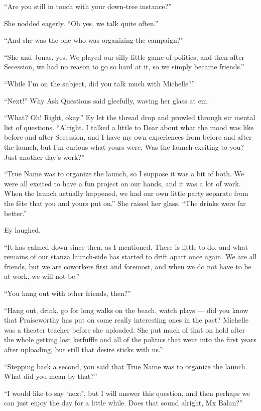 ``Are you still in touch with your down-tree instance?''

She nodded eagerly. ``Oh yes, we talk quite often.''

``And she was the one who was organizing the campaign?''

``She and Jonas, yes. We played our silly little game of politics, and then after Secession, we had no reason to go so hard at it, so we simply became friends.''

``While I'm on the subject, did you talk much with Michelle?''

``Next!'' Why Ask Questions said gleefully, waving her glass at em.

``What? Oh! Right, okay.'' Ey let the thread drop and prowled through eir mental list of questions. ``Alright. I talked a little to Dear about what the mood was like before and after Secession, and I have my own experiences from before and after the launch, but I'm curious what yours were. Was the launch exciting to you? Just another day's work?''

``True Name was to organize the launch, so I suppose it was a bit of both. We were all excited to have a fun project on our hands, and it was a lot of work. When the launch actually happened, we had our own little party separate from the fête that you and yours put on.'' She raised her glass. ``The drinks were far better.''

Ey laughed.

``It has calmed down since then, as I mentioned. There is little to do, and what remains of our stanza launch-side has started to drift apart once again. We are all friends, but we are coworkers first and foremost, and when we do not have to be at work, we will not be.''

``You hang out with other friends, then?''

``Hang out, drink, go for long walks on the beach, watch plays — did you know that Praiseworthy has put on some really interesting ones in the past? Michelle was a theater teacher before she uploaded. She put much of that on hold after the whole getting lost kerfuffle and all of the politics that went into the first years after uploading, but still that desire sticks with us.''

``Stepping back a second, you said that True Name was to organize the launch. What did you mean by that?''

``I would like to say `next', but I will answer this question, and then perhaps we can just enjoy the day for a little while. Does that sound alright, Mx Balan?''

